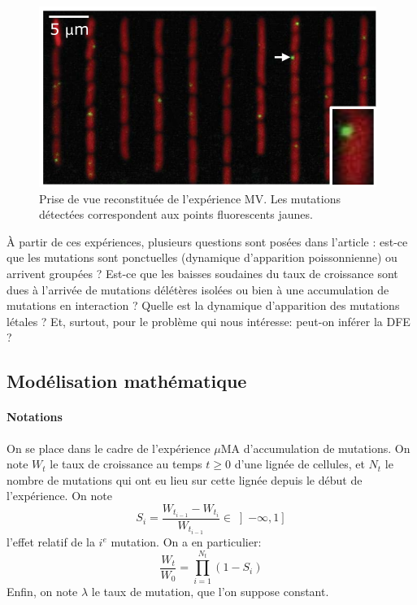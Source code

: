 \documentclass[12pt]{article}
\newcommand{\iof}[1]{\left]#1\right]}
\begin{document}
\begin{figure}[h]
  \begin{center}
    \vspace{3mm}
    \includegraphics[scale=0.5]{../Img/Schema_MV.png}
  \end{center}
  \caption{\label{fig:MV}Prise de vue reconstituée de l'expérience MV. Les mutations détectées correspondent aux points fluorescents jaunes.}
\end{figure}

À partir de ces expériences, plusieurs questions sont posées dans l'article : est-ce que les mutations sont ponctuelles (dynamique d'apparition poissonnienne) ou arrivent groupées ? Est-ce que les baisses soudaines du taux de croissance sont dues à l’arrivée de mutations délétères isolées ou bien à une accumulation de mutations en interaction ? Quelle est la dynamique d’apparition des mutations létales ? Et, surtout, pour le problème qui nous intéresse: peut-on inférer la DFE ?

\subsection{Modélisation mathématique}

\paragraph{Notations}
On se place dans le cadre de l'expérience $\mu$MA d'accumulation de mutations. On note $W_t$ le taux de croissance au temps $t\geqslant 0$ d'une lignée de cellules, et $N_t$ le nombre de mutations qui ont eu lieu sur cette lignée depuis le début de l'expérience. On note \[S_i=\frac{W_{t_{i-1}}-W_{t_i}}{W_{t_{i-1}}}\in\iof{-\infty,1}\] l'effet relatif de la $i^e$ mutation. On a en particulier: 
\begin{equation}\label{mod}
  \frac{W_t}{W_0}=\prod_{i=1}^{N_t}(1-S_i)
\end{equation}
Enfin, on note $\lambda$ le taux de mutation, que l'on suppose constant.
\end{document}
